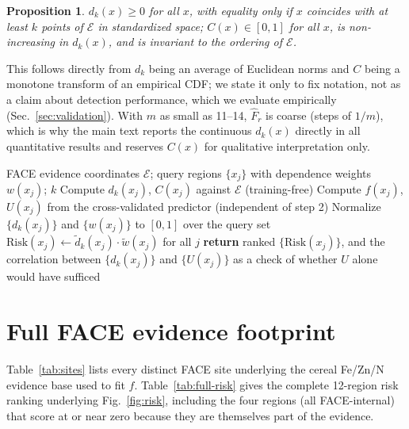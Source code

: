 \documentclass{article}
\newtheorem{proposition}{Proposition}
\begin{document}
\begin{proposition}
$d_k(x) \geq 0$ for all $x$, with equality only if $x$ coincides with at least $k$ points of $\mathcal{E}$ in standardized space; $C(x) \in [0,1]$ for all $x$, is non-increasing in $d_k(x)$, and is invariant to the ordering of $\mathcal{E}$.
\end{proposition}
This follows directly from $d_k$ being an average of Euclidean norms and $C$ being a monotone transform of an empirical CDF; we state it only to fix notation, not as a claim about detection performance, which we evaluate empirically (Sec.~\ref{sec:validation}). With $m$ as small as 11--14, $\widehat{F}_r$ is coarse (steps of $1/m$), which is why the main text reports the continuous $d_k(x)$ directly in all quantitative results and reserves $C(x)$ for qualitative interpretation only.

\begin{algorithm}[h]
\small
\caption{Evidential-distance risk audit}
\label{alg:pipeline}
\begin{algorithmic}[1]
\REQUIRE FACE evidence coordinates $\mathcal{E}$; query regions $\{x_j\}$ with dependence weights $w(x_j)$; $k$
  \STATE Compute $d_k(x_j)$, $C(x_j)$ against $\mathcal{E}$ (training-free)
  \STATE Compute $f(x_j)$, $U(x_j)$ from the cross-validated predictor (independent of step 2)
\ENDFOR
\STATE Normalize $\{d_k(x_j)\}$ and $\{w(x_j)\}$ to $[0,1]$ over the query set
\STATE $\mathrm{Risk}(x_j) \gets \widetilde{d}_k(x_j)\cdot \widetilde{w}(x_j)$ for all $j$
\STATE \textbf{return} ranked $\{\mathrm{Risk}(x_j)\}$, and the correlation between $\{d_k(x_j)\}$ and $\{U(x_j)\}$ as a check of whether $U$ alone would have sufficed
\end{algorithmic}
\end{algorithm}

\section{Full FACE evidence footprint}
\label{app:full-table}
Table~\ref{tab:sites} lists every distinct FACE site underlying the cereal Fe/Zn/N evidence base used to fit $f$. Table~\ref{tab:full-risk} gives the complete 12-region risk ranking underlying Fig.~\ref{fig:risk}, including the four regions (all FACE-internal) that score at or near zero because they are themselves part of the evidence.
\end{document}

